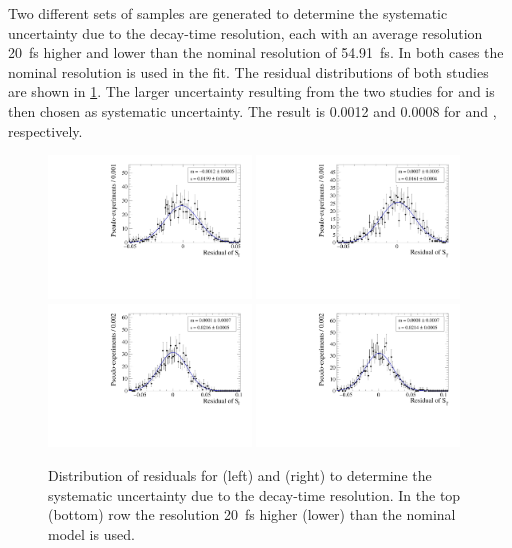 Two different sets of samples are generated to determine the systematic uncertainty due to the decay-time resolution, each with an average resolution \SI{20}{\femto\second} higher and lower than the nominal resolution of \SI{54.91}{\femto\second}.
In both cases the nominal resolution is used in the fit.
The residual distributions of both studies are shown in \cref{fig:systUncertRes}.
The larger uncertainty resulting from the two studies for \Sf and \Sfbar is then chosen as systematic uncertainty.
The result is \num{0.0012} and \num{0.0008} for \Sf and \Sfbar, respectively.
\begin{figure}[tbp]
    \centering
    \includegraphics[width=0.48\textwidth]{10Systematics/figs/ResHigh_Sf_res.pdf}
    \includegraphics[width=0.48\textwidth]{10Systematics/figs/ResHigh_Sfbar_res.pdf}\\
    \includegraphics[width=0.48\textwidth]{10Systematics/figs/ResLow_Sf_res.pdf}
    \includegraphics[width=0.48\textwidth]{10Systematics/figs/ResLow_Sfbar_res.pdf}
    \caption{Distribution of residuals for \Sf (left) and \Sfbar (right) to determine the systematic uncertainty due to the decay-time resolution.
    In the top  (bottom) row the resolution \SI{20}{\femto\second} higher (lower) than the nominal model is used.}
    \label{fig:systUncertRes}
\end{figure}

